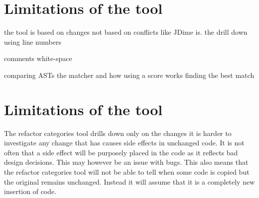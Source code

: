 \section{Limitations of the tool}

the tool is based on changes not based on conflicts like JDime is.
the drill down using line numbers


comments
white-space

comparing ASTs
the matcher and how using a score works
finding the best match


% 

\section{Limitations of the tool}
The refactor categories tool drills down only on the changes it is harder to investigate any change that has causes side effects in unchanged code.  It is not often that a side effect will be purposely placed in the code as it reflects bad design decisions.  This may however be an issue with bugs.  This also means that the refactor categories tool will not be able to tell when some code is copied but the original remains unchanged. Instead it will assume that it is a completely new insertion of code.
